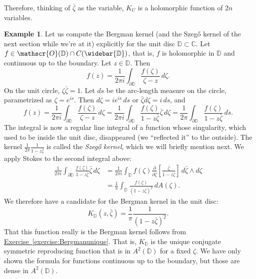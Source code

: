\documentclass[12pt,openany]{book}
\newcommand{\C}{{\mathbb{C}}}
\newcommand{\D}{{\mathbb{D}}}
\newcommand{\sO}{{\mathscr{O}}}
\theoremstyle{plain}
\theoremstyle{remark}
\theoremstyle{definition}
\theoremstyle{exercise}
\theoremstyle{example}
\newtheorem{example}[thm]{Example}
\newcommand{\exerciseref}[1]{\hyperref[#1]{Exercise~\ref*{#1}}}
\begin{document}
Therefore, thinking of
$\bar{\zeta}$ as the variable, $K_U$ is a holomorphic function of
$2n$ variables.

\begin{example} \label{example:bergmankerneldisc}
%
%
Let us compute the Bergman kernel (and
the Szeg{\H{o}} kernel of the next section while we're at it)
explicitly for the
unit disc $\D \subset \C$.  Let $f \in \sO(\D) \cap C(\widebar{\D})$, that
is, $f$ is holomorphic in $\D$ and continuous up to the boundary.
Let $z \in \D$.
Then
\begin{equation*}
f(z) = \frac{1}{2\pi i} \int_{\partial \D} \frac{f(\zeta)}{\zeta-z} \,
d\zeta .
\end{equation*}
On the unit circle, $\zeta \bar{\zeta} = 1$.  Let $ds$ be
the arc-length measure on the circle, parametrized as $\zeta =
e^{is}$.
Then $d\zeta = i e^{is} \, ds$ or $\bar{\zeta} d\zeta = i \,ds$, and
\begin{equation*}
f(z) = \frac{1}{2\pi i} \int_{\partial \D} \frac{f(\zeta)}{\zeta-z} \,
d\zeta
= \frac{1}{2\pi i} \int_{\partial \D} \frac{f(\zeta)}{1-z\bar{\zeta}}
\bar{\zeta} \, d\zeta
= \frac{1}{2\pi} \int_{\partial \D} \frac{f(\zeta)}{1-z\bar{\zeta}} \, ds .
\end{equation*}
The integral is now a regular line integral of a function whose
singularity, which used to be inside the unit disc, disappeared
(we ``reflected it'' to the outside).
The kernel $\frac{1}{2\pi} \frac{1}{1-z\bar{\zeta}}$ is called the
\emph{Szeg{\H{o}} kernel}, which we will briefly mention next.
We apply Stokes to the second integral above:
\begin{equation*}
\begin{split}
\frac{1}{2\pi i} \int_{\partial \D} \frac{f(\zeta)}{1-z\bar{\zeta}}
\bar{\zeta} \, d\zeta
&=
\frac{1}{2\pi i} \int_{\D} f(\zeta)
\frac{\partial}{\partial \bar{\zeta}} \left[
\frac{\bar{\zeta}}{1-z\bar{\zeta}} \right] \,
d\bar{\zeta} \wedge d\zeta
\\
&=
\frac{1}{\pi} \int_{\D}
\frac{f(\zeta)}{{(1-z\bar{\zeta})}^2} \, dA(\zeta) .
\end{split}
\end{equation*}
We therefore have a candidate for the 
Bergman kernel in the unit disc:
\begin{equation*}
K_{\D}(z,\bar{\zeta}) = \frac{1}{\pi} \frac{1}{{(1-z\bar{\zeta})}^2} .
\end{equation*}
That this function really is the Bergman kernel
follows from \exerciseref{exercise:Bergmanunique}.
That is, $K_{\D}$ is the unique conjugate symmetric
reproducing function that is in
$A^2({\D})$ for a fixed $\zeta$.
We have only shown the formula for functions continuous up to the boundary,
but those are dense in $A^2({\D})$.
\end{example}
\end{document}

